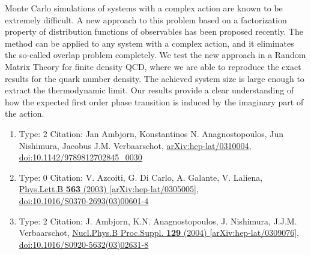 \documentclass[a4paper,10pt]{article}
\begin{document}
\begin{enumerate}
Monte Carlo simulations of systems with a complex action are known to be extremely difficult. A new approach to this problem based on a factorization property of distribution functions of observables has been proposed recently. The method can be applied to any system with a complex action, and it eliminates the so-called overlap problem completely. We test the new approach in a Random Matrix Theory for finite density QCD, where we are able to reproduce the exact results for the quark number density. The achieved system size is large enough to extract the thermodynamic limit. Our results provide a clear understanding of how the expected first order phase transition is induced by the imaginary part of the action.
\begin{enumerate}
  \item Type: 2 Citation: Jan Ambjorn, Konstantinos N. Anagnostopoulos, Jun Nishimura, Jacobus J.M. Verbaarschot, \href{https://arxiv.org/abs/hep-lat/0310004}{arXiv:hep-lat/0310004},\\\href{https://www.doi.org/10.1142/9789812702845_0030}{doi:10.1142/9789812702845\_0030}
  \item Type: 0 Citation: V. Azcoiti, G. Di Carlo, A. Galante, V. Laliena, \href{https://www.doi.org/10.1016/S0370-2693(03)00601-4}{Phys.Lett.B {\bf 563} (2003) }  \href{https://arxiv.org/abs/hep-lat/0305005}{[arXiv:hep-lat/0305005]},\\\href{https://www.doi.org/10.1016/S0370-2693(03)00601-4}{doi:10.1016/S0370-2693(03)00601-4}
  \item Type: 2 Citation: J. Ambjorn, K.N. Anagnostopoulos, J. Nishimura, J.J.M. Verbaarschot, \href{https://www.doi.org/10.1016/S0920-5632(03)02631-8}{Nucl.Phys.B Proc.Suppl. {\bf 129} (2004) }  \href{https://arxiv.org/abs/hep-lat/0309076}{[arXiv:hep-lat/0309076]},\\\href{https://www.doi.org/10.1016/S0920-5632(03)02631-8}{doi:10.1016/S0920-5632(03)02631-8}

\end{enumerate}
\end{enumerate}
\end{document}
